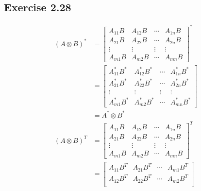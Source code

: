 \documentclass{article}
\begin{document}
\subsection*{Exercise 2.28}

\begin{align*}
  (A \otimes B)^*       & = \begin{bmatrix}
                              A_{11} B & A_{12} B & \cdots & A_{1n} B \\
                              A_{21} B & A_{22} B & \cdots & A_{2n} B \\
                              \vdots   & \vdots   & \vdots & \vdots   \\
                              A_{m1} B & A_{m2} B & \cdots & A_{mn} B
                            \end{bmatrix}^*             \\
                        & = \begin{bmatrix}
                              A_{11}^* B^* & A_{12}^* B^* & \cdots & A_{1n}^* B^* \\
                              A_{21}^* B^* & A_{22}^* B^* & \cdots & A_{2n}^* B^* \\
                              \vdots       & \vdots       & \vdots & \vdots       \\
                              A_{m1}^* B^* & A_{m2}^* B^* & \cdots & A_{mn}^* B^*
                            \end{bmatrix} \\
                        & = A^* \otimes B^*                                     \\
  (A \otimes B)^T       & = \begin{bmatrix}
                              A_{11} B & A_{12} B & \cdots & A_{1n} B \\
                              A_{21} B & A_{22} B & \cdots & A_{2n} B \\
                              \vdots   & \vdots   & \vdots & \vdots   \\
                              A_{m1} B & A_{m2} B & \cdots & A_{mn} B
                            \end{bmatrix}^T             \\
                        & = \begin{bmatrix}
                              A_{11} B^T & A_{21} B^T & \cdots & A_{m1} B^T \\
                              A_{12} B^T & A_{22} B^T & \cdots & A_{m2} B^T \\

\end{bmatrix}
\end{align*}
\end{document}
